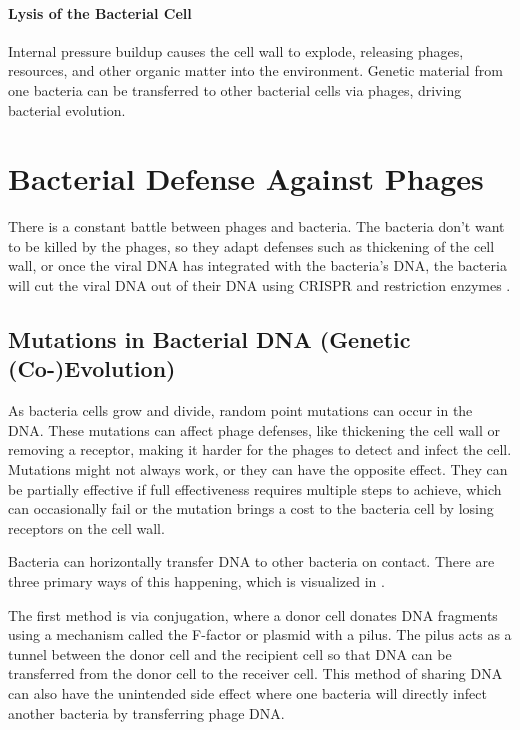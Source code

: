 \paragraph{Lysis of the Bacterial Cell}
Internal pressure buildup causes the cell wall to explode, releasing phages, resources, and other organic matter into the environment. 
Genetic material from one bacteria can be transferred to other bacterial cells via phages, driving bacterial evolution. 


\section{Bacterial Defense Against Phages} 
There is a constant battle between phages and bacteria. 
The bacteria don't want to be killed by the phages, so they adapt defenses such as thickening of the cell wall, or once the viral DNA has integrated with the bacteria's DNA, the bacteria will cut the viral DNA out of their DNA using CRISPR and restriction enzymes \cite{iglerPhenotypicFluxRole2022}. 

\subsection{Mutations in Bacterial DNA (Genetic (Co-)Evolution)}
As bacteria cells grow and divide, random point mutations can occur in the DNA. 
These mutations can affect phage defenses, like thickening the cell wall or removing a receptor, making it harder for the phages to detect and  infect the cell. 
Mutations might not always work, or they can have the opposite effect. 
They can be partially effective if full effectiveness requires multiple steps to achieve, which can occasionally fail \cite{lenskiTWOSTEPRESISTANCEESCHERICHIA1984} or the mutation brings a cost to the bacteria cell by losing receptors on the cell wall. 

Bacteria can horizontally transfer DNA to other bacteria on contact. 
There are three primary ways of this happening, which is visualized in . 

The first method is via conjugation, where a donor cell donates DNA fragments using a mechanism called the F-factor or plasmid with a pilus. 
The pilus acts as a tunnel between the donor cell and the recipient cell so that DNA can be transferred from the donor cell to the receiver cell. 
This method of sharing DNA can also have the unintended side effect where one bacteria will directly infect another bacteria by transferring phage DNA. 

